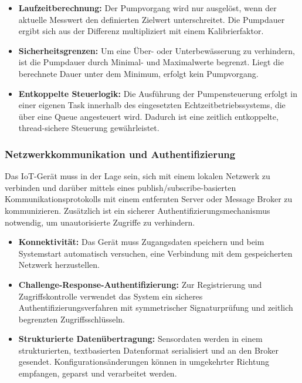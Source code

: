\begin{itemize}
	\item \textbf{Laufzeitberechnung:} Der Pumpvorgang wird nur ausgelöst, wenn der aktuelle Messwert den definierten Zielwert unterschreitet. Die Pumpdauer ergibt sich aus der Differenz multipliziert mit einem Kalibrierfaktor.
	
	\item \textbf{Sicherheitsgrenzen:} Um eine Über- oder Unterbewässerung zu verhindern, ist die Pumpdauer durch Minimal- und Maximalwerte begrenzt. Liegt die berechnete Dauer unter dem Minimum, erfolgt kein Pumpvorgang.
	
	\item \textbf{Entkoppelte Steuerlogik:} Die Ausführung der Pumpensteuerung erfolgt in einer eigenen Task innerhalb des eingesetzten Echtzeitbetriebssystems, die über eine Queue angesteuert wird. Dadurch ist eine zeitlich entkoppelte, thread-sichere Steuerung gewährleistet.
\end{itemize}

\subsubsection{Netzwerkkommunikation und Authentifizierung}

Das IoT-Gerät muss in der Lage sein, sich mit einem lokalen Netzwerk zu verbinden und darüber mittels eines publish/subscribe-basierten Kommunikationsprotokolls mit einem entfernten Server oder Message Broker zu kommunizieren. Zusätzlich ist ein sicherer Authentifizierungsmechanismus notwendig, um unautorisierte Zugriffe zu verhindern.

\begin{itemize}
	\item \textbf{Konnektivität:} Das Gerät muss Zugangsdaten speichern und beim Systemstart automatisch versuchen, eine Verbindung mit dem gespeicherten Netzwerk herzustellen.
	
	\item \textbf{Challenge-Response-Authentifizierung:} Zur Registrierung und Zugriffskontrolle verwendet das System ein sicheres Authentifizierungsverfahren mit symmetrischer Signaturprüfung und zeitlich begrenzten Zugriffsschlüsseln.
	
	\item \textbf{Strukturierte Datenübertragung:} Sensordaten werden in einem strukturierten, textbasierten Datenformat serialisiert und an den Broker gesendet. Konfigurationsänderungen können in umgekehrter Richtung empfangen, geparst und verarbeitet werden.
\end{itemize}

